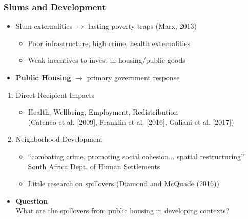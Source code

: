 \documentclass[aspectratio=149]{beamer}
\begin{document}
\begin{frame}
\frametitle{Slums and Development}


\begin{itemize}
  \item Slum externalities $\rightarrow$ lasting poverty traps (Marx, 2013) 
    \begin{itemize}
      \item Poor infrastructure, high crime, health externalities
      \item Weak incentives to invest in housing/public goods
    \end{itemize}  
\vspace{.2cm}
  \item \textbf{Public Housing} $\rightarrow$ primary government response
\end{itemize}
\begin{enumerate}
  \item Direct Recipient Impacts
    \begin{itemize}
      \item Health, Wellbeing, Employment, Redistribution \\ \footnotesize{(Cateneo et al. [2009], Franklin et al. [2016], Galiani et al. [2017])}
    \end{itemize}
    \vspace{.1cm}
\item Neighborhood Development
  \begin{itemize}
    \item ``combating crime, promoting social cohesion... spatial restructuring'' South Africa Dept. of Human Settlements
    \item Little research on spillovers \footnotesize{(Diamond and McQuade (2016))}
  \end{itemize}
\end{enumerate}

\begin{itemize}
  \item \textbf{Question} \\ 
  \vspace{.1cm}
  What are the spillovers from public housing in developing contexts?
\end{itemize}
\end{frame}
\end{document}
